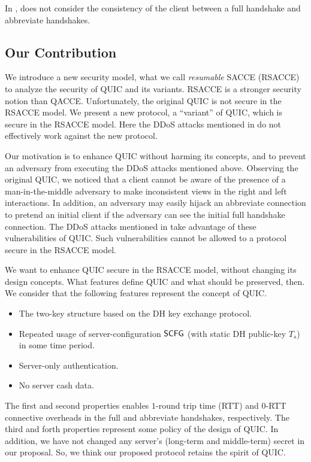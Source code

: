 In \cite{LJBN15:QUIC},
 does not
consider the consistency of the client between a full
handshake and abbreviate handshakes.
\fi
\subsection{Our Contribution} \label{sec:proposal}
We introduce a new security model, what we call \textit{resumable} SACCE
(RSACCE) to analyze the security of QUIC and its variants.
RSACCE is a stronger security notion than QACCE.
Unfortunately, the original QUIC is not secure in the RSACCE model.
We present a new protocol, a ``variant'' of QUIC, which is secure in the RSACCE model.
Here the DDoS attacks mentioned in \cite{LJBN15:QUIC} do not effectively work against the new protocol.

Our motivation is to enhance QUIC without harming its concepts, and to prevent an adversary from executing the DDoS attacks mentioned above.
Observing the original QUIC, we noticed  that
a client cannot be aware of the presence of a man-in-the-middle adversary to make inconsistent views
in the right and left interactions.
In addition, an adversary may easily hijack an abbreviate connection to pretend an initial client
if the adversary can see the initial full handshake connection.
The DDoS attacks mentioned in \cite{LJBN15:QUIC} take advantage of these vulnerabilities of QUIC.
Such vulnerabilities cannot be allowed to a protocol secure in the RSACCE model.

We want to enhance QUIC secure in the RSACCE model, without changing its design concepts.
What features define QUIC and what should be preserved, then.
We consider that the following features represent the concept of QUIC.

\begin{itemize}
\item The two-key structure based on the DH key exchange protocol.
\item Repeated usage of server-configuration $\mathsf{SCFG}$ (with static DH public-key $T_s$) in some time period.
\item Server-only authentication.
\item No server cash data.
\end{itemize}

The  first and second properties enables
$1$-round trip time (RTT) and $0$-RTT connective overheads in the full and abbreviate handshakes, respectively.
The third and forth properties represent some policy of the design of QUIC.
In addition, we have not changed any server's (long-term and middle-term) secret in our proposal.
So, we think our proposed protocol retains the spirit of QUIC.

